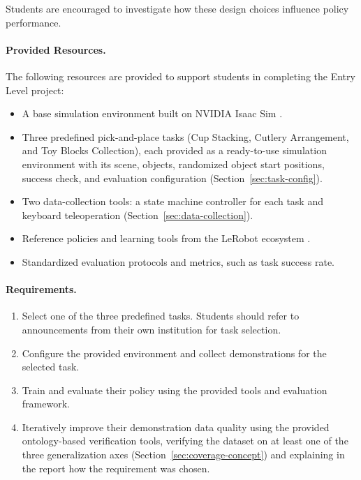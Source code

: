 \documentclass[11pt]{article}
\begin{document}
Students are encouraged to investigate how these design choices influence policy performance.

\paragraph{Provided Resources.}

The following resources are provided to support students in completing the Entry Level project:
\begin{itemize}
  \item A base simulation environment built on NVIDIA Isaac Sim \cite{isaacsim2026}.
   \item Three predefined pick-and-place tasks (Cup Stacking, Cutlery Arrangement, and Toy Blocks Collection), each provided as a ready-to-use simulation environment with its scene, objects, randomized object start positions, success check, and evaluation configuration (Section~\ref{sec:task-config}).
  \item Two data-collection tools: a state machine controller for each task and keyboard teleoperation (Section~\ref{sec:data-collection}).
  \item Reference policies and learning tools from the LeRobot ecosystem \cite{cadene2024lerobot}.
  \item Standardized evaluation protocols and metrics, such as task success rate.
\end{itemize}

\paragraph{Requirements.}
\label{sec:entry-requirements}

\begin{enumerate}
    \item Select one of the three predefined tasks. Students should refer to announcements from their own institution for task selection.
    \item Configure the provided environment and collect demonstrations for the selected task.
    \item Train and evaluate their policy using the provided tools and evaluation framework.
    \item Iteratively improve their demonstration data quality using the provided ontology-based verification tools, verifying the dataset on at least one of the three generalization axes (Section~\ref{sec:coverage-concept}) and explaining in the report how the requirement was chosen.
\end{enumerate}
\end{document}
